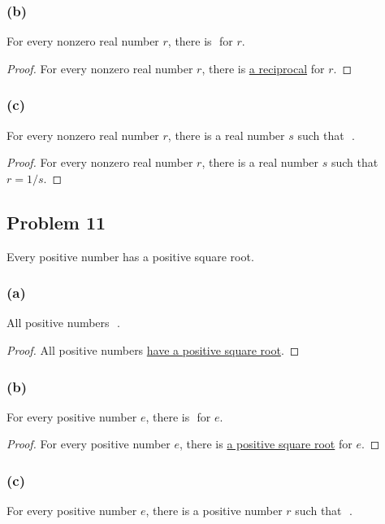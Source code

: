 \documentclass[14pt]{extarticle}
\newcommand{\fbl}{\underline{\hspace{1cm}}\,\,}
\begin{document}
\subsubsection{(b)}
For every nonzero real number $r$, there is \fbl for $r$.

\begin{proof}
    For every nonzero real number $r$, there is \underline{a reciprocal} for $r$.
\end{proof}

\subsubsection{(c)}
For every nonzero real number $r$, there is a real number $s$ such that \fbl.

\begin{proof}
    For every nonzero real number $r$, there is a real number $s$ such that
    \underline{$r = 1/s$}.
\end{proof}

\subsection{Problem 11}
Every positive number has a positive square root.

\subsubsection{(a)}
All positive numbers \fbl.

\begin{proof}
    All positive numbers \underline{have a positive square root}.
\end{proof}

\subsubsection{(b)}
For every positive number $e$, there is \fbl for $e$.

\begin{proof}
    For every positive number $e$, there is \underline{a positive square root} for
    $e$.
\end{proof}

\subsubsection{(c)}
For every positive number $e$, there is a positive number $r$ such that \fbl.
\end{document}
